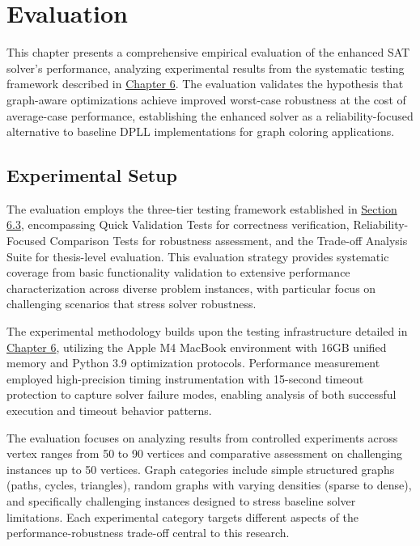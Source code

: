 \section{Evaluation}

This chapter presents a comprehensive empirical evaluation of the enhanced SAT solver's performance, analyzing experimental results from the systematic testing framework described in \hyperref[sec:testing]{Chapter 6}. The evaluation validates the hypothesis that graph-aware optimizations achieve improved worst-case robustness at the cost of average-case performance, establishing the enhanced solver as a reliability-focused alternative to baseline DPLL implementations for graph coloring applications.

\subsection{Experimental Setup}

The evaluation employs the three-tier testing framework established in \hyperref[sec:test-suite-implementation]{Section 6.3}, encompassing Quick Validation Tests for correctness verification, Reliability-Focused Comparison Tests for robustness assessment, and the Trade-off Analysis Suite for thesis-level evaluation. This evaluation strategy provides systematic coverage from basic functionality validation to extensive performance characterization across diverse problem instances, with particular focus on challenging scenarios that stress solver robustness.

The experimental methodology builds upon the testing infrastructure detailed in \hyperref[sec:testing]{Chapter 6}, utilizing the Apple M4 MacBook environment with 16GB unified memory and Python 3.9 optimization protocols. Performance measurement employed high-precision timing instrumentation with 15-second timeout protection to capture solver failure modes, enabling analysis of both successful execution and timeout behavior patterns.

The evaluation focuses on analyzing results from controlled experiments across vertex ranges from 50 to 90 vertices and comparative assessment on challenging instances up to 50 vertices. Graph categories include simple structured graphs (paths, cycles, triangles), random graphs with varying densities (sparse to dense), and specifically challenging instances designed to stress baseline solver limitations. Each experimental category targets different aspects of the performance-robustness trade-off central to this research.

